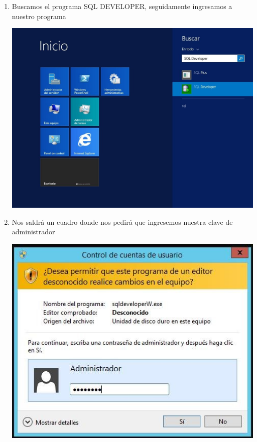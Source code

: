 \begin{enumerate}[1.]
	\item Buscamos el programa SQL DEVELOPER, seguidamente ingresamos a nuestro programa\\
	\begin{center}
	\includegraphics[width=15cm]{./Imagenes/img24} 
	\end{center}

	\item Nos saldr\'a un cuadro donde nos pedir\'a que ingresemos nuestra clave de administrador\\
	\begin{center}
	\includegraphics[width=15cm]{./Imagenes/img25} 
	\end{center}


\end{enumerate}
